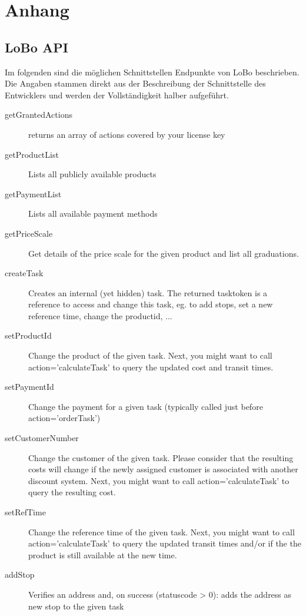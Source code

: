 
\appendix
\chapter{Anhang}
\label{sec:Anhang}

\section{LoBo API}
\label{sec:loboAPI}
Im folgenden sind die möglichen Schnittstellen Endpunkte von LoBo beschrieben. Die Angaben stammen direkt aus der Beschreibung der Schnittstelle des Entwicklers und werden der Vollständigkeit halber aufgeführt.

\begin{description}
  \item[getGrantedActions] returns an array of actions covered by your license key
  \item[getProductList] Lists all publicly available products
  \item[getPaymentList] Lists all available payment methods
  \item[getPriceScale] Get details of the price scale for the given product and list all graduations.
  \item[createTask] Creates an internal (yet hidden) task. The returned tasktoken is a reference to access and change this task, eg. to add stops, set a new reference time, change the productid, ...
  \item[setProductId] Change the product of the given task. Next, you might want to call action='calculateTask' to query the updated cost and transit times.
  \item[setPaymentId] Change the payment for a given task (typically called just before action='orderTask')
  \item[setCustomerNumber] Change the customer of the given task. Please consider that the resulting costs will change if the newly assigned customer is associated with another discount system. Next, you might want to call action='calculateTask' to query the resulting cost.
  \item[setRefTime] Change the reference time of the given task. Next, you might want to call action='calculateTask' to query the updated transit times and/or if the the product is still available at the new time.
  \item[addStop] Verifies an address and, on success (statuscode > 0): adds the address as new stop to the given task

\end{description}
